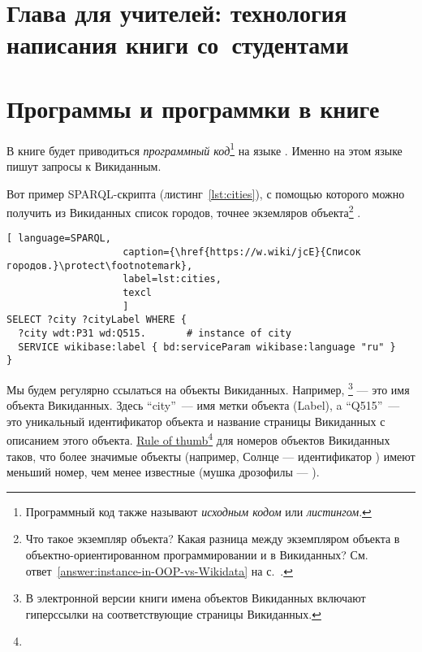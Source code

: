 


\chapter{Глава для учителей: технология написания книги со~студентами}
\label{ch:howto-write-book}



\chapter{Программы и программки в книге}
\label{ch:listing_about}

В книге будет приводиться \emph{программный код}\footnote[][0cm]{%
    Программный код также называют  \emph{исходным кодом} или 
    \emph{листингом}.
%   
} на языке . 
Именно на этом языке пишут запросы к Викиданным.


Вот пример SPARQL-скрипта (листинг~\ref{lst:cities}), 
с помощью которого можно получить из Викиданных список городов, 
точнее экземляров объекта\footnote{\label{question:instance-in-OOP-vs-Wikidata}Что такое экземпляр объекта? 
    Какая разница между экземпляром объекта 
    в объектно-ориентированном программировании и в Викиданных?
    См. ответ~\ref{answer:instance-in-OOP-vs-Wikidata} на с.~\pageref{answer:instance-in-OOP-vs-Wikidata}.
    }
.

\begin{lstlisting}[ language=SPARQL, 
                    caption={\href{https://w.wiki/jcE}{Список городов.}\protect\footnotemark},
                    label=lst:cities,
                    texcl 
                    ]
SELECT ?city ?cityLabel WHERE { 
  ?city wdt:P31 wd:Q515.       # instance of city
  SERVICE wikibase:label { bd:serviceParam wikibase:language "ru" }
}
\end{lstlisting}%

Мы будем регулярно ссылаться на объекты Викиданных. 
Например, \footnote[][0cm]{%
%    
    В электронной версии книги имена объектов Викиданных включают гиперссылки на соответствующие страницы Викиданных.
} 
--- это имя объекта Викиданных. 
Здесь ``city''~--- имя метки объекта (Label), 
a ``Q515''~--- это уникальный идентификатор объекта 
и название страницы Викиданных с описанием этого объекта.
\href{https://en.wikipedia.org/wiki/Rule_of_thumb}{Rule of thumb}\footnote[][0cm]{%
%
} 
для номеров объектов Викиданных таков, что более значимые объекты 
(например, Солнце --- идентификатор ) 
имеют меньший номер, чем менее известные
(мушка дрозофилы --- ).
